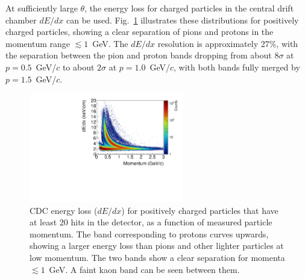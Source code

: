 At sufficiently large $\theta$, the energy loss for charged particles in the central drift chamber $dE/dx$ can be used.   Fig.~\ref{fig:performcdcdedx} illustrates these distributions for positively charged particles, showing a clear separation of pions and protons in the momentum range $\lesssim 1$~GeV. %
The $dE/dx$ resolution is approximately 27\%, with the separation between the pion and proton bands dropping from about $8\sigma$ at $p=0.5$~GeV/$c$ to about $2\sigma$ at $p=1.0$~GeV/$c$, with both bands fully merged by $p=1.5$~GeV/$c$.

\begin{figure}[tbp]
\begin{center}
\includegraphics[width=0.6\textwidth]{figures/cdc_dedx.pdf}
\caption{\label{fig:performcdcdedx}
CDC energy loss ($dE/dx$) for positively charged particles that have at least 20 hits in the detector, as a function of measured particle momentum.  The band corresponding to protons curves upwards, showing a larger energy loss than pions and other lighter particles at low momentum.  The two bands show a clear separation for momenta  $\lesssim 1$~GeV.  A faint kaon band can be seen between them.
}
\end{center}
\end{figure}

